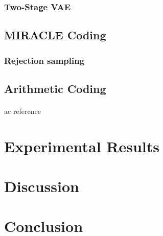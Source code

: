 \documentclass{article}
\begin{document}
\paragraph{}

\subsubsection{Two-Stage VAE}
\paragraph{}
\cite{dai2019diagnosing}

\subsection{MIRACLE Coding}
\paragraph{}
\cite{havasi2018minimal}

\subsubsection{Rejection sampling}
\paragraph{}
\cite{harsha2007communication}

\subsection{Arithmetic Coding}
\paragraph{}
ac reference \cite{rissanen1981universal}

\section{Experimental Results}

\cite{zhao2015loss}
\section{Discussion}
\section{Conclusion}

\printbibliography
\end{document}
